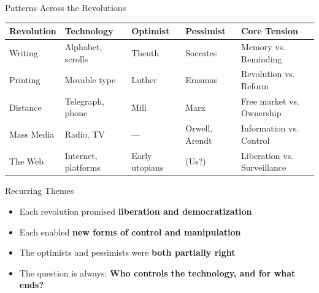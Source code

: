 \documentclass[aspectratio=169,11pt]{beamer}
\begin{document}
\begin{frame}{Patterns Across the Revolutions}
\begin{table}
\centering
\scriptsize
\begin{tabular}{@{}llllp{2.8cm}@{}}
\toprule
\textbf{Revolution} & \textbf{Technology} & \textbf{Optimist} & \textbf{Pessimist} & \textbf{Core Tension} \\
\midrule
Writing & Alphabet, scrolls & Theuth & Socrates & Memory vs. Reminding \\
Printing & Movable type & Luther & Erasmus & Revolution vs. Reform \\
Distance & Telegraph, phone & Mill & Marx & Free market vs. Ownership \\
Mass Media & Radio, TV & --- & Orwell, Arendt & Information vs. Control \\
The Web & Internet, platforms & Early utopians & (Us?) & Liberation vs. Surveillance \\
\bottomrule
\end{tabular}
\end{table}

\vspace{0.3em}
\begin{block}{Recurring Themes}
\begin{itemize}
  \item Each revolution promised \textbf{liberation and democratization}
  \item Each enabled \textbf{new forms of control and manipulation}
  \item The optimists and pessimists were \textbf{both partially right}
  \item The question is always: \textbf{Who controls the technology, and for what ends?}
\end{itemize}
\end{block}
\end{frame}
\end{document}
